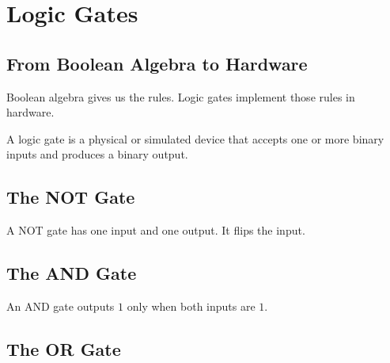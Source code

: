 \chapter{Logic Gates}
\label{chap:logic-gates}



\section{From Boolean Algebra to Hardware}

Boolean algebra gives us the rules. Logic gates implement those rules in hardware.

\begin{definition}
A logic gate is a physical or simulated device that accepts one or more binary inputs and produces a binary output.
\end{definition}

\section{The NOT Gate}

A NOT gate has one input and one output. It flips the input.

\begin{center}

\end{center}

\section{The AND Gate}

An AND gate outputs \(1\) only when both inputs are \(1\).

\section{The OR Gate}

